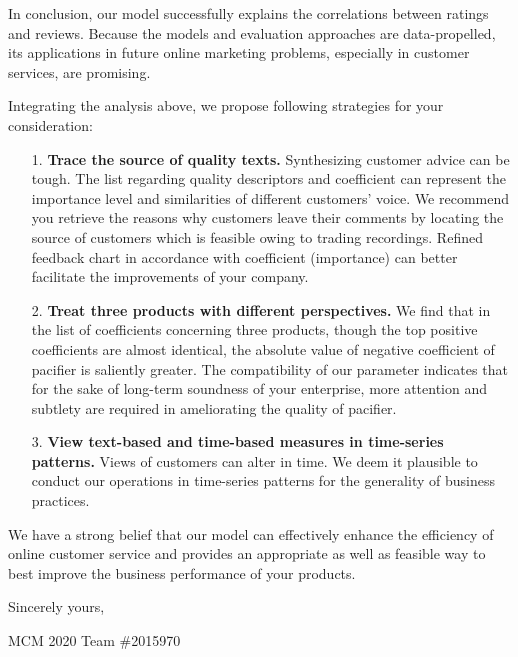 \documentclass[12pt]{article}%
\begin{document}
In conclusion, our model successfully explains the correlations between ratings and reviews. Because the models and evaluation approaches are data-propelled, its applications in future online marketing problems, especially in customer services, are promising.

Integrating the analysis above, we propose following strategies for your consideration:

\begin{itemize}
	\item[1.]\textbf{Trace the source of quality texts.} Synthesizing customer advice can be tough. The list regarding quality descriptors and coefficient can represent the importance level and similarities of different customers’ voice. We recommend you retrieve the reasons why customers leave their comments by locating the source of customers which is feasible owing to trading recordings. Refined feedback chart in accordance with coefficient (importance) can better facilitate the improvements of your company.
	\item[2.]\textbf{Treat three products with different perspectives.} We find that in the list of coefficients concerning three products, though the top positive coefficients are almost identical, the absolute value of negative coefficient of pacifier is saliently greater. The compatibility of our parameter indicates that for the sake of long-term soundness of your enterprise, more attention and subtlety are required in ameliorating the quality of pacifier. 
	\item[3.]\textbf{View text-based and time-based measures in time-series patterns.} Views of customers can alter in time. We deem it plausible to conduct our operations in time-series patterns for the generality of business practices.
\end{itemize}

We have a strong belief that our model can effectively enhance the efficiency of online customer service and provides an appropriate as well as feasible way to best improve the business performance of your products.

	\vspace{13pt}
	
{\large Sincerely yours,

MCM 2020 Team \#2015970}

\thispagestyle{empty}

\newpage
\thispagestyle{empty}
\vspace*{-5pc}%
\setmainfont{Times New Roman}
\tableofcontents   
\setcounter{page}{0}                                               
\newpage      
\end{document}
